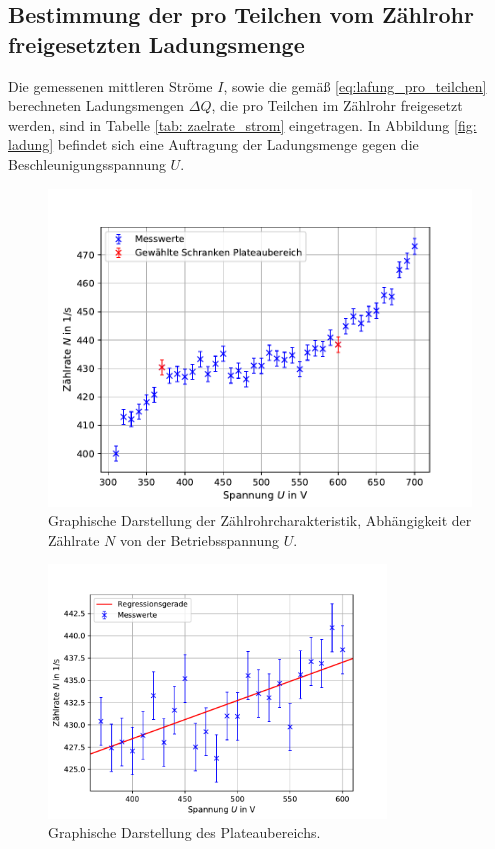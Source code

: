 \subsection{Bestimmung der pro Teilchen vom Zählrohr freigesetzten Ladungsmenge}
Die gemessenen mittleren Ströme $I$, sowie die gemäß \eqref{eq:lafung_pro_teilchen} berechneten Ladungsmengen $\Delta Q$, die pro %
Teilchen im Zählrohr freigesetzt werden, sind in Tabelle \ref{tab: zaelrate_strom} eingetragen. In Abbildung
\ref{fig: ladung} befindet sich eine Auftragung der Ladungsmenge gegen die Beschleunigungsspannung $U$.


\newpage

\begin{figure}
  \centering
  \includegraphics[width = \textwidth]{../Messdaten/plots/all_counts.pdf}
  \caption{Graphische Darstellung der Zählrohrcharakteristik, Abhängigkeit der Zählrate $N$ von der Betriebsspannung $U$.}
  \label{fig: zählrate_ges}
\end{figure}
\begin{figure}
  \centering
  \includegraphics[width = 0.8\textwidth]{../Messdaten/plots/plateau.pdf}
  \caption{Graphische Darstellung des Plateaubereichs.}
  \label{fig: plateau}
\end{figure}
